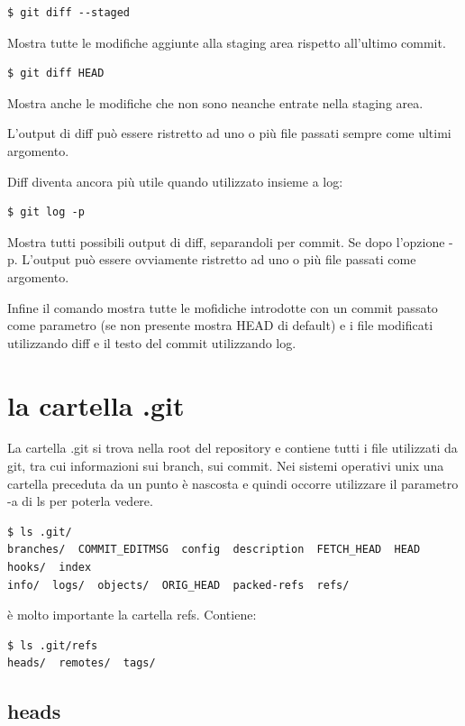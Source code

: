 \documentclass{article} \usepackage[textwidth=19cm,textheight=24cm]{geometry}
\begin{document}
\begin{verbatim}
$ git diff --staged
\end{verbatim}

Mostra tutte le modifiche aggiunte alla staging area rispetto all'ultimo commit.

\begin{verbatim}
$ git diff HEAD
\end{verbatim}

Mostra anche le modifiche che non sono neanche entrate nella staging area.

L'output di diff può essere ristretto ad uno o più file passati sempre come
ultimi argomento.

Diff diventa ancora più utile quando utilizzato insieme a log:

\begin{verbatim}
$ git log -p
\end{verbatim}

Mostra tutti possibili output di diff, separandoli per commit. Se dopo l'opzione
-p. L'output può essere ovviamente ristretto ad uno o più file passati come
argomento.

Infine il comando  mostra tutte le mofidiche introdotte con un
commit passato come parametro (se non presente mostra HEAD di default) e i file
modificati utilizzando diff e il testo del commit utilizzando log.

\section{la cartella .git}

La cartella .git si trova nella root del repository e contiene tutti i file
utilizzati da git, tra cui informazioni sui branch, sui commit. Nei sistemi
operativi unix una cartella preceduta da un punto è nascosta e quindi occorre
utilizzare il parametro -a di ls per poterla vedere.

\begin{verbatim}
$ ls .git/
branches/  COMMIT_EDITMSG  config  description  FETCH_HEAD  HEAD  hooks/  index  
info/  logs/  objects/  ORIG_HEAD  packed-refs  refs/
\end{verbatim}

è molto importante la cartella refs. Contiene:

\begin{verbatim}
$ ls .git/refs
heads/  remotes/  tags/
\end{verbatim}

\subsection{heads}
\end{document}
